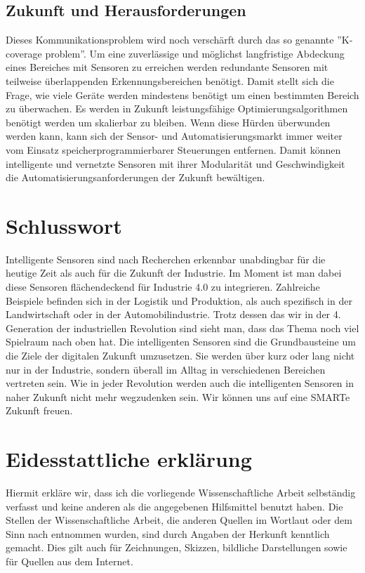 \documentclass[a4paper,12pt]{scrartcl}
\begin{document}
\subsection{Zukunft und Herausforderungen}
Dieses Kommunikationsproblem wird noch verschärft durch das so genannte ''K-coverage problem''. Um eine zuverlässige und möglichst langfristige Abdeckung eines Bereiches mit Sensoren zu erreichen werden redundante Sensoren mit teilweise überlappenden Erkennungsbereichen benötigt. Damit stellt sich die Frage, wie viele Geräte werden mindestens benötigt um einen bestimmten Bereich zu überwachen. Es werden in Zukunft leistungsfähige Optimierungsalgorithmen benötigt werden um skalierbar zu bleiben. 
Wenn diese Hürden überwunden werden kann, kann sich der Sensor- und Automatisierungsmarkt immer weiter vom Einsatz speicherprogrammierbarer Steuerungen entfernen. Damit können intelligente und vernetzte Sensoren mit ihrer Modularität und Geschwindigkeit die Automatisierungsanforderungen der Zukunft bewältigen.

\cite{(Dynamic Wireless Sensor Networks New Directions for Smart Technologies, Seite 3 ff.)}   
\newpage

\section{Schlusswort}
Intelligente Sensoren sind nach Recherchen erkennbar unabdingbar für die heutige Zeit als auch für die Zukunft der Industrie. Im Moment ist man dabei diese Sensoren flächendeckend für Industrie 4.0 zu integrieren. Zahlreiche Beispiele befinden sich in der Logistik und Produktion, als auch spezifisch in der Landwirtschaft oder in der Automobilindustrie. Trotz dessen das wir in der 4. Generation der industriellen Revolution sind sieht man, dass das Thema noch viel Spielraum nach oben hat. Die intelligenten Sensoren sind die Grundbausteine um die Ziele der digitalen Zukunft umzusetzen. Sie werden über kurz oder lang nicht nur in der Industrie, sondern überall im Alltag in verschiedenen Bereichen vertreten sein. Wie in jeder Revolution werden auch die intelligenten Sensoren in naher Zukunft nicht mehr wegzudenken sein. Wir können uns auf eine SMARTe Zukunft freuen.

\newpage

\listoffigures

\newpage
\section{Eidesstattliche erklärung}
Hiermit erkläre wir, dass ich die vorliegende Wissenschaftliche Arbeit selbständig verfasst und keine anderen als die angegebenen Hilfsmittel benutzt haben.
Die Stellen der Wissenschaftliche Arbeit, die anderen Quellen im Wortlaut oder dem Sinn nach entnommen wurden, sind durch Angaben der Herkunft kenntlich gemacht. Dies gilt auch für Zeichnungen, Skizzen, bildliche Darstellungen sowie für Quellen aus dem Internet.
\clearpage

\newpage

\end{document}
